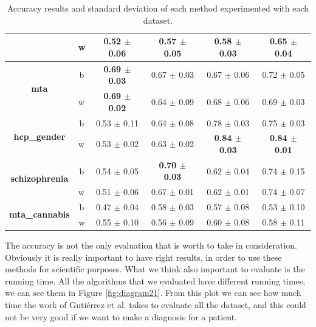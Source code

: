 \begin{table}
{\begin{tabular}{c|c|c|c|c|c}
		\cline{2-6}
		& \multicolumn{1}{l|}{w} & 0.52 $\pm$ 0.06            & 0.57 $\pm$ 0.05    & 0.58 $\pm$ 0.03 & 0.65 $\pm$ 0.04                      \\ 
		\bottomrule
		\multirow{2}{*}{\textbf{mta}}                                & b                      & \textbf{0.69 $\pm$ 0.03}           & 0.67 $\pm$ 0.03    & 0.67 $\pm$ 0.06                      & 0.72 $\pm$ 0.05                      \\ 
		\cline{2-6}
		& \multicolumn{1}{l|}{w} & \textbf{0.69 $\pm$ 0.02}            & 0.64 $\pm$ 0.09    & 0.68 $\pm$ 0.06  & 0.69 $\pm$ 0.03                      \\ 
		\bottomrule
		\multirow{2}{*}{\textbf{hcp\_gender}}                        & b                      & 0.53 $\pm$ 0.11            & 0.64 $\pm$ 0.08    &  0.78 $\pm$ 0.03                     & 0.75 $\pm$ 0.03                      \\ 
		\cline{2-6}
		& \multicolumn{1}{l|}{w} & 0.53 $\pm$ 0.02            & 0.63 $\pm$ 0.02    & \textbf{0.84 $\pm$ 0.03} & \textbf{0.84 $\pm$ 0.01}             \\ 
		\bottomrule
		\multirow{2}{*}{\textbf{schizophrenia}}                      & b                      & 0.54 $\pm$ 0.05            & \textbf{0.70 $\pm$ 0.03}    & 0.62 $\pm$ 0.04                     & 0.74 $\pm$ 0.15                      \\ 
		\cline{2-6}
		& \multicolumn{1}{l|}{w} & 0.51 $\pm$ 0.06            & 0.67 $\pm$ 0.01    & 0.62 $\pm$ 0.01   & 0.74 $\pm$ 0.07                      \\ 
		\bottomrule
		\multicolumn{1}{l|}{\multirow{2}{*}{\textbf{mta\_cannabis}}} & b                      & 0.47 $\pm$ 0.04            & 0.58 $\pm$ 0.03    & 0.57 $\pm$ 0.08 & 0.53 $\pm$ 0.10                      \\ 
		\cline{3-6}
		\multicolumn{1}{l|}{}                                        & w                      & 0.55 $\pm$ 0.10            & 0.56 $\pm$ 0.09    & 0.60 $\pm$ 0.08 & 0.58 $\pm$ 0.11                      \\
		\hline
		\end{tabular}
	}
		\caption{Accuracy results and standard deviation of each method experimented with each dataset.}
		\label{tab:all_results}
\end{table}
		

The accuracy is not the only evaluation that is worth to take in consideration. Obviously it is really important to have right results, in order to use these methods for scientific purposes. What we think also important to evaluate is the running time. All the algorithms that we evaluated have different running times, we can see them in Figure \ref{fig:diagram21}. From this plot we can see how much time the work of Guti\'{e}rrez et al. \cite{GutierrezBio} takes to evaluate all the dataset, and this could not be very good if we want to make a diagnosis for a patient. 
\vspace{0.5cm}

